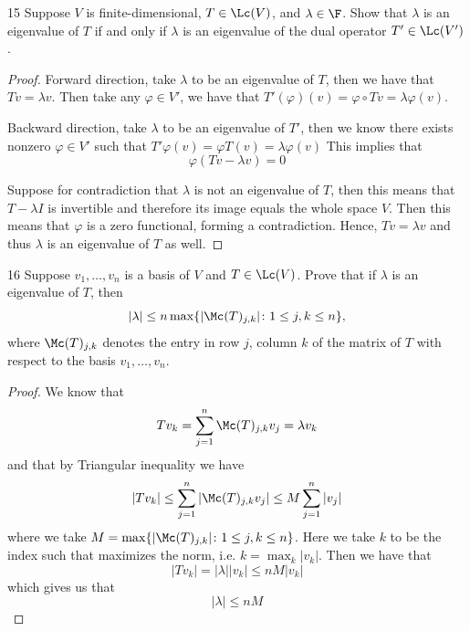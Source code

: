 \documentclass{extarticle}
\begin{document}
\begin{problem}{15}
    Suppose \(V\) is finite-dimensional, \(T \in \Lc(V)\), and \(\lambda \in \F\). Show that 
    \(\lambda\) is an eigenvalue of \(T\) if and only if \(\lambda\) is an eigenvalue of 
    the dual operator \(T' \in \Lc(V')\).
\end{problem}

\begin{proof}
Forward direction, take \(\lambda\) to be an eigenvalue of \(T\), then we have that \(Tv = \lambda v\). 
Then take any \(\varphi \in V'\), we have that \(T'(\varphi) (v)= \varphi \circ Tv 
= \lambda \varphi (v)\). 

Backward direction, take \(\lambda\) to be an eigenvalue of \(T'\), then we know there exists 
nonzero \(\varphi \in V'\) such that 
\(T' \varphi (v) = \varphi T(v) = \lambda \varphi (v)\) 
This implies that 
\[\varphi(Tv - \lambda v) = 0\]

Suppose for contradiction that \(\lambda\) is not an eigenvalue of \(T\), then this means that 
\(T - \lambda I\) is invertible and therefore its image equals the whole space \(V\). Then this 
means that \(\varphi\) is a zero functional, forming a contradiction. Hence, \(Tv = \lambda v\)
and thus \(\lambda\) is an eigenvalue of \(T\) as well. 

\end{proof}

\begin{problem}{16}
    Suppose \(v_1, \ldots, v_n\) is a basis of \(V\) and \(T \in \Lc(V)\). Prove that if 
    \(\lambda\) is an eigenvalue of \(T\), then 
    \[|\lambda| \leq n \max \{|\Mc(T)_{j,k}|\colon 1 \leq j,k \leq n\},\]
    where \(\Mc(T)_{j,k}\) denotes the entry in row \(j\), column \(k\) of the matrix of 
    \(T\) with respect to the basis \(v_1, \ldots, v_n\). 
\end{problem}

\begin{proof}
%
We know that 
\[T v_k = \sum_{j=1}^{n} \Mc(T)_{j, k} v_j = \lambda v_k\]
and that by Triangular inequality we have 
\[|Tv_k| \leq \sum_{j=1}^{n} |\Mc(T)_{j, k} v_j| \leq M \sum_{j=1}^{n} |v_j|\]
where we take \(M = \max \{|\Mc(T)_{j,k}|\colon 1 \leq j,k \leq n\}\). Here we take 
\(k\) to be the index such that maximizes the norm, i.e. \(k = \max_k |v_k|\). Then we have that 
\[|T v_k| = |\lambda| |v_k| \leq nM |v_k|\]
which gives us that 
\[|\lambda| \leq nM\]
\end{proof}
\end{document}
